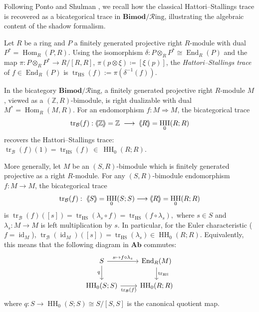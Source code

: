 \documentclass[11pt,oneside]{amsart}
\DeclareMathOperator{\Hom}{Hom}
\DeclareMathOperator{\HH}{HH}
\DeclareMathOperator{\End}{End}
\DeclareMathOperator{\id}{id}
\numberwithin{equation}{section}
\numberwithin{figure}{section}
\theoremstyle{plain}
\theoremstyle{definition}
\theoremstyle{remark}
\newcommand{\shspace}{\hspace{.5mm}} %
\newcommand{\sh}[1]{{\ensuremath{\shspace\hspace{1mm}\makebox[-1mm]{$\langle$}\makebox[0mm]{$\langle$}\hspace{1mm}{#1}\makebox[1mm]{$\rangle$}\makebox[0mm]{$\rangle$}\shspace}}}
\begin{document}
Following Ponto and Shulman \cite{PONSH}, we recall how the classical
Hattori--Stallings trace is recovered as a bicategorical trace in
\(\mathbf{Bimod}/\mathcal R\mathrm{ing}\), illustrating the algebraic
content of the shadow formalism.

\begin{definition}[{\cite{HA}}]\label{def:HS-ordinary}
Let $R$ be a ring and $P$ a finitely generated projective right $R$-module with dual 
$P^*=\Hom_R(P,R)$.  
Using the isomorphism $\delta: P \otimes_R P^* \cong \End_R(P)$ and the map 
$\pi: P \otimes_R P^* \to R/[R,R]$, $\pi(p \otimes \xi) \coloneqq [\xi(p)]$, the 
\emph{Hattori--Stallings trace} of $f \in \End_R(P)$ is
\(
\operatorname{tr}_{\mathrm{HS}}(f) := \pi(\delta^{-1}(f)).
\)
\end{definition}


 

\begin{example}\label{ex:HS-as-bicat-trace}
In the bicategory $\mathbf{Bimod}/\mathcal{R}\mathrm{ing}$, 
a finitely generated projective right $R$-module $M$,  viewed as a $(\mathbb{Z}, R)$-bimodule, is right dualizable  with dual 
$M^*=\Hom_R(M,R)$.  
For an endomorphism $f:M\Rightarrow M$, the bicategorical trace
\[
\operatorname{tr}_{\mathcal B}(f): \sh{\mathbb{Z}}=\mathbb{Z}\;\longrightarrow\;\sh{R}=\HH_0(R;R)
\]
recovers the Hattori--Stallings trace: $\operatorname{tr}_{\mathcal B}(f)(1)=\operatorname{tr}_{\mathrm{HS}}(f)\ \in\ \HH_0(R;R).$

More generally, let $M$ be an $(S,R)$-bimodule which is finitely generated projective as a right 
$R$-module. For any $(S,R)$-bimodule endomorphism $f:M\to M$, the bicategorical trace
\[
\operatorname{tr}_{\mathcal B}(f):\ \sh{S}=\HH_0(S;S)\longrightarrow \sh{R}=\HH_0(R;R)
\]
is
\(
\operatorname{tr}_{\mathcal B}(f)([s])=\operatorname{tr}_{\mathrm{HS}}(\lambda_s\circ f)=\operatorname{tr}_{\mathrm{HS}}(f\circ\lambda_s),
\)
where $s\in S$ and $\lambda_s:M\to M$ is left multiplication by $s$.
In particular, for the Euler characteristic ($f=\id_M$),
\(
\operatorname{tr}_{\mathcal B}(\id_M)([s])=\operatorname{tr}_{\mathrm{HS}}(\lambda_s)\in \HH_0(R;R).
\)
Equivalently, this means that
the following diagram in $\mathbf{Ab}$ commutes:
\begin{equation}\label{diag:classical-bicat-vs-HS}
\begin{tikzcd}
S \arrow[r, "{\,s\mapsto f\circ\lambda_s\,}"] \arrow[d, "q"'] 
  & \End_R(M) \arrow[d, "\operatorname{tr}_{\mathrm{HS}}"] \\
\HH_0(S;S) \arrow[r, "\operatorname{tr}_{\mathcal B}(f)"'] 
  & \HH_0(R;R)
\end{tikzcd}
\end{equation}
where \(q\colon S\to \HH_0(S;S)\cong S/[S,S]\) is the canonical quotient map.
\end{example}
\end{document}
